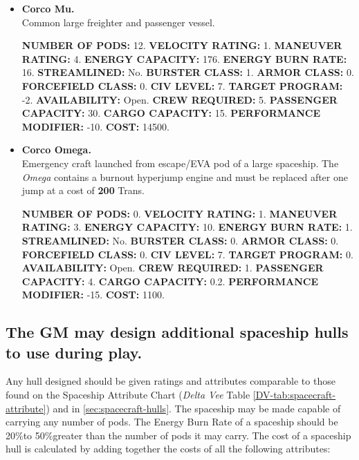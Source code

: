\begin{itemize}
\item\textbf{Corco Mu.}\\
Common large freighter and passenger vessel. 

\textbf{NUMBER OF PODS:} 12. \textbf{VELOCITY RATING:} 1.
\textbf{MANEUVER RATING:} 4. \textbf{ENERGY CAPACITY:} 176.
\textbf{ENERGY BURN RATE:} 16. \textbf{STREAMLINED:} No. \textbf{BURSTER
  CLASS:} 1. \textbf{ARMOR CLASS:} 0.  \textbf{FORCEFIELD CLASS:} 0.
\textbf{CIV LEVEL:} 7. \textbf{TARGET PROGRAM:} -2.
\textbf{AVAILABILITY:} Open. \textbf{CREW REQUIRED:} 5.
\textbf{PASSENGER CAPACITY:} 30. \textbf{CARGO CAPACITY:}
15. \textbf{PERFORMANCE MODIFIER:} -10. \textbf{COST:} 14500.


\item\textbf{Corco Omega.}\\
  Emergency craft launched from escape/EVA pod of a large spaceship.
  The \emph{Omega} contains a burnout hyperjump engine and must be
  replaced after one jump at a cost of \textbf{200} Trans.
  
  \textbf{NUMBER OF PODS:} 0. \textbf{VELOCITY RATING:} 1.
  \textbf{MANEUVER RATING:} 3. \textbf{ENERGY CAPACITY:} 10.
  \textbf{ENERGY BURN RATE:} 1. \textbf{STREAMLINED:} No.
  \textbf{BURSTER CLASS:} 0. \textbf{ARMOR CLASS:} 0.
  \textbf{FORCEFIELD CLASS:} 0.  \textbf{CIV LEVEL:} 7. \textbf{TARGET
    PROGRAM:} 0. \textbf{AVAILABILITY:} Open. \textbf{CREW REQUIRED:}
  1.  \textbf{PASSENGER CAPACITY:} 4.  \textbf{CARGO CAPACITY:} 0.2.
  \textbf{PERFORMANCE MODIFIER:} -15. \textbf{COST:} 1100.
\end{itemize}

\subsection[Additional Hulls]{The GM may design additional spaceship
  hulls to use during 
  play.}
\label{sec:additional-hulls}



Any hull designed should be given ratings and attributes comparable to
those found on the Spaceship Attribute Chart (\emph{Delta Vee} 
Table \ref{DV-tab:spacecraft-attribute}) and in
\ref{sec:spacecraft-hulls}. The 
spaceship may 
be made capable of carrying any number of pods. The Energy Burn Rate
of a spaceship should be 20\%to 50\%greater than the number of pods it
may carry. The cost of a spaceship hull is calculated by adding
together the costs of all the following attributes:

